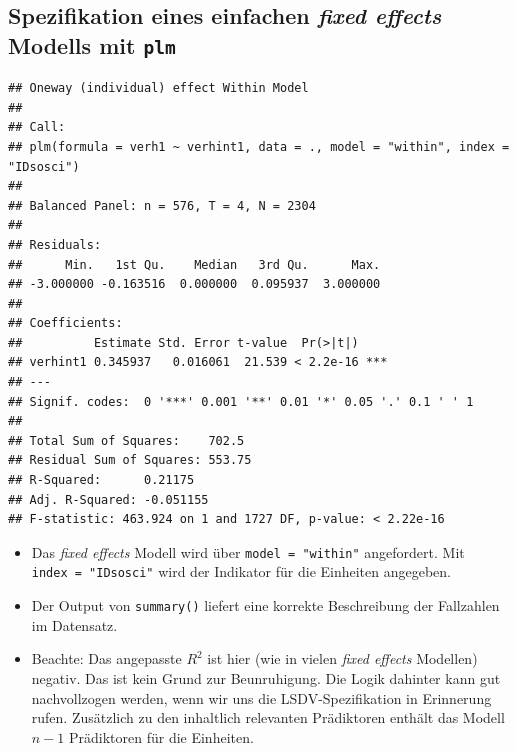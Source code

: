 \documentclass[]{book}
\newenvironment{Shaded}{\begin{snugshade}}{\end{snugshade}}
\newcommand{\DataTypeTok}[1]{\textcolor[rgb]{0.13,0.29,0.53}{#1}}
\newcommand{\KeywordTok}[1]{\textcolor[rgb]{0.13,0.29,0.53}{\textbf{#1}}}
\newcommand{\NormalTok}[1]{#1}
\newcommand{\OperatorTok}[1]{\textcolor[rgb]{0.81,0.36,0.00}{\textbf{#1}}}
\newcommand{\StringTok}[1]{\textcolor[rgb]{0.31,0.60,0.02}{#1}}
\providecommand{\tightlist}{%
  \setlength{\itemsep}{0pt}\setlength{\parskip}{0pt}}
\begin{document}
\hypertarget{spezifikation-eines-einfachen-fixed-effects-modells-mit-plm}{%
\subsection*{\texorpdfstring{Spezifikation eines einfachen \emph{fixed effects} Modells mit \texttt{plm}}{Spezifikation eines einfachen fixed effects Modells mit plm}}\label{spezifikation-eines-einfachen-fixed-effects-modells-mit-plm}}

\begin{Shaded}
\end{Shaded}

\begin{verbatim}
## Oneway (individual) effect Within Model
## 
## Call:
## plm(formula = verh1 ~ verhint1, data = ., model = "within", index = "IDsosci")
## 
## Balanced Panel: n = 576, T = 4, N = 2304
## 
## Residuals:
##      Min.   1st Qu.    Median   3rd Qu.      Max. 
## -3.000000 -0.163516  0.000000  0.095937  3.000000 
## 
## Coefficients:
##          Estimate Std. Error t-value  Pr(>|t|)    
## verhint1 0.345937   0.016061  21.539 < 2.2e-16 ***
## ---
## Signif. codes:  0 '***' 0.001 '**' 0.01 '*' 0.05 '.' 0.1 ' ' 1
## 
## Total Sum of Squares:    702.5
## Residual Sum of Squares: 553.75
## R-Squared:      0.21175
## Adj. R-Squared: -0.051155
## F-statistic: 463.924 on 1 and 1727 DF, p-value: < 2.22e-16
\end{verbatim}

\begin{itemize}
\tightlist
\item
  Das \emph{fixed effects} Modell wird über \texttt{model\ =\ "within"} angefordert. Mit \texttt{index\ =\ "IDsosci"} wird der Indikator für die Einheiten angegeben.
\item
  Der Output von \texttt{summary()} liefert eine korrekte Beschreibung der Fallzahlen im Datensatz.
\item
  Beachte: Das angepasste \(R^2\) ist hier (wie in vielen \emph{fixed effects} Modellen) negativ. Das ist kein Grund zur Beunruhigung. Die Logik dahinter kann gut nachvollzogen werden, wenn wir uns die LSDV-Spezifikation in Erinnerung rufen. Zusätzlich zu den inhaltlich relevanten Prädiktoren enthält das Modell \(n - 1\) Prädiktoren für die Einheiten.
\end{itemize}
\end{document}
